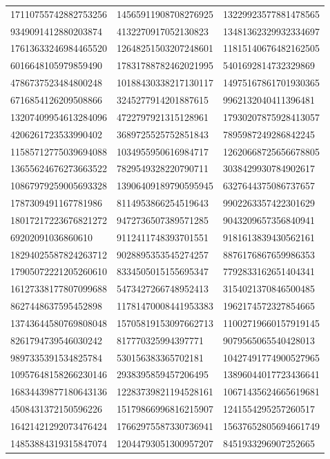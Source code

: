 \begin{longtable}{*{3}{l}}
17110755742882753256&14565911908708276925&13229923577881478565\\
9349091412880203874&4132270917052130823&13481362329932334697\\
17613633246984465520&12648251503207248601&11815140676482162505\\
6016648105979859490&17831788782462021995&5401692814732329869\\
4786737523484800248&10188430338217130117&14975167861701930365\\
6716854126209508866&3245277914201887615&9962132040411396481\\
13207409954613284096&4722797921315128961&17930207875928413057\\
4206261723533990402&3689725525752851843&7895987249286842245\\
11585712775039694088&1034955950616984717&12620668725656678805\\
13655624676273663522&7829549328220790711&3038429930784902617\\
10867979259005693328&13906409189790595945&6327644375086737657\\
1787309491167781986&8114953866254519643&9902263357422301629\\
18017217223676821272&9472736507389571285&9043209657356840941\\
69202091036860610&9112411748393701551&9181613839430562161\\
18294025587824263712&9028895353545274257&8876176867659986353\\
17905072221205260610&8334505015155695347&7792833162651404341\\
16127338177807099688&5473427266748952413&3154021370846500485\\
8627448637595452898&11781470008441953383&1962174572327854665\\
13743644580769808048&15705819153097662713&11002719660157919145\\
8261794739546030242&817770325994397771&9079565065540428013\\
9897335391534825784&530156383365702181&10427491774900527965\\
10957648158266230146&2938395859457206495&13896044017723436641\\
16834439877180643136&12283739821194528161&10671435624665619681\\
4508431372150596226&15179866996816215907&1241554295257260517\\
16421421292073476424&17662975587330736941&15637652805694661749\\
14853884319315847074&12044793051300957207&8451933296907252665\\

\end{longtable}
